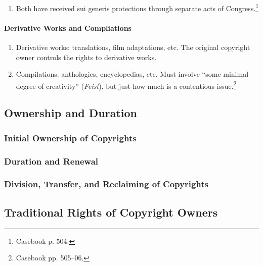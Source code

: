 \begin{enumerate}
    \item Both have received sui generis protections through separate acts of 
    Congress.\footnote{Casebook p. 504.}
\end{enumerate}

\paragraph{Derivative Works and Compliations}

\begin{enumerate}
    \item Derivative works: translations, film adaptations, etc. The original 
    copyright owner controls the rights to derivative works.
    \item Compilations: anthologies, encyclopedias, etc. Must involve ``some 
    minimal degree of creativity'' (\emph{Feist}), but just how much is a 
    contentious issue.\footnote{Casebook pp. 505--06.}
\end{enumerate}

\newpage %

\subsection{Ownership and Duration}


\subsubsection{Initial Ownership of Copyrights}


\subsubsection{Duration and Renewal}


\subsubsection{Division, Transfer, and Reclaiming of Copyrights}


\subsection{Traditional Rights of Copyright Owners}

